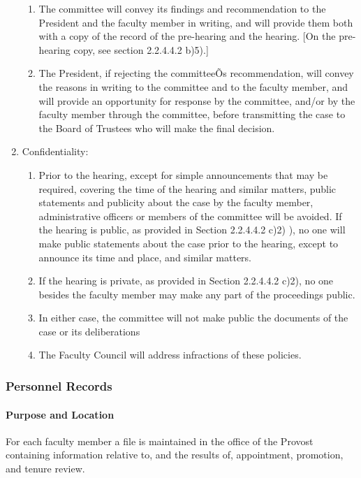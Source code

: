 \documentclass[letterpaper, 11pt]{article}
\begin{document}
\begin{enumerate}[label=\alph*)]
{\begin{enumerate}[label=\arabic*)]
							\item{The committee will convey its findings and recommendation to the President and the faculty member in writing, and will provide them both with a copy of the record of the pre-hearing and the hearing.  [On the pre-hearing copy, see section 2.2.4.4.2 b)5).]}
							\item{The President, if rejecting the committeeÕs recommendation, will convey the reasons in writing to the committee and to the faculty member, and will provide an opportunity for response by the committee, and/or by the faculty member through the committee, before transmitting the case to the Board of Trustees who will make the final decision.}
						\end{enumerate}
					}
					\item{Confidentiality:
						\begin{enumerate}[label=\arabic*)]
							\item{Prior to the hearing, except for simple announcements that may be required, covering the time of the hearing and similar matters, public statements and publicity about the case by the faculty member, administrative officers or members of the committee will be avoided.  If the hearing is public, as provided in Section 2.2.4.4.2 c)2) ), no one will make public statements about the case prior to the hearing, except to announce its time and place, and similar matters.}
							\item{If the hearing is private, as provided in Section 2.2.4.4.2 c)2), no one besides the faculty member may make any part of the proceedings public.}
							\item{In either case, the committee will not make public the documents of the case or its deliberations}
							\item{The Faculty Council will address infractions of these policies.}
						\end{enumerate}
					}
				\end{enumerate}
		\subsubsection{Personnel Records}
			\paragraph{Purpose and Location}
				For each faculty member a file is maintained in the office of the Provost containing information relative to, and the results of, appointment, promotion, and tenure review.
\end{document}

